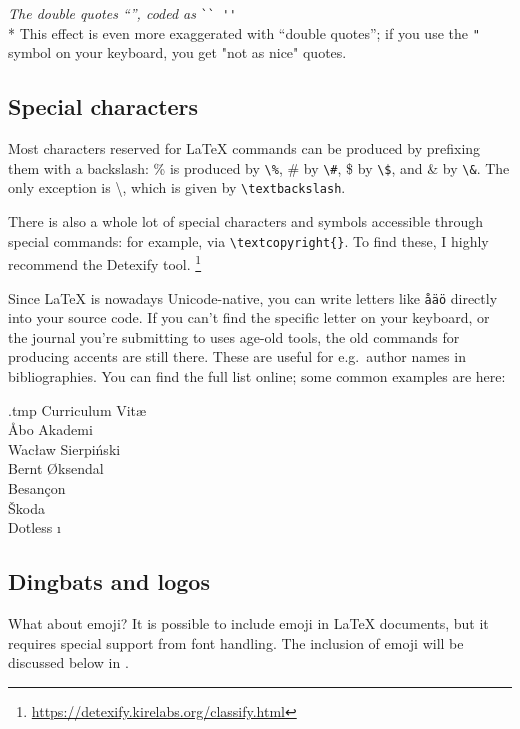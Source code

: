 \medskip\noindent\emph{The double quotes ``'', coded as} \verb|`` ''|\\*
This effect is even more exaggerated with ``double quotes'';
if you use the \verb|"| symbol on your keyboard,
you get "not as nice" quotes.



%
%
\subsection{Special characters}

Most characters reserved for \LaTeX{} commands can be produced by prefixing them with a backslash:
\% is produced by \verb|\%|, \# by \verb|\#|, \$ by \verb|\$|, and \& by \verb|\&|.
The only exception is \textbackslash, which is given by \verb|\textbackslash|.

There is also a whole lot of special characters and symbols accessible
through special commands: for example, \textcopyright{} via \verb|\textcopyright{}|.
To find these, I highly recommend the Detexify tool.%
\footnote{\url{https://detexify.kirelabs.org/classify.html}}

\bigskip\noindent%
Since \LaTeX{} is nowadays Unicode-native,
you can write letters like \verb|åäö| directly into your source code.
If you can't find the specific letter on your keyboard,
or the journal you're submitting to uses age-old tools,
the old commands for producing accents are still there.
These are useful for e.g.\ author names in bibliographies.
You can find the full list online;
some common examples are here:
%
\begin{VerbatimOut}{\jobname.tmp}
Curriculum Vit\ae\\
\r{A}bo Akademi\\
Wac\l{}aw Sierpi\'{n}ski\\
Bernt \O{}ksendal\\
Besan\c{c}on\\
\v{S}koda\\
Dotless \i
\end{VerbatimOut}
\ShowExample


%
%
\subsection{Dingbats and logos}


What about emoji?
It is possible to include emoji in \LaTeX{} documents,
but it requires special support from font handling.
The inclusion of emoji will be discussed below in .


